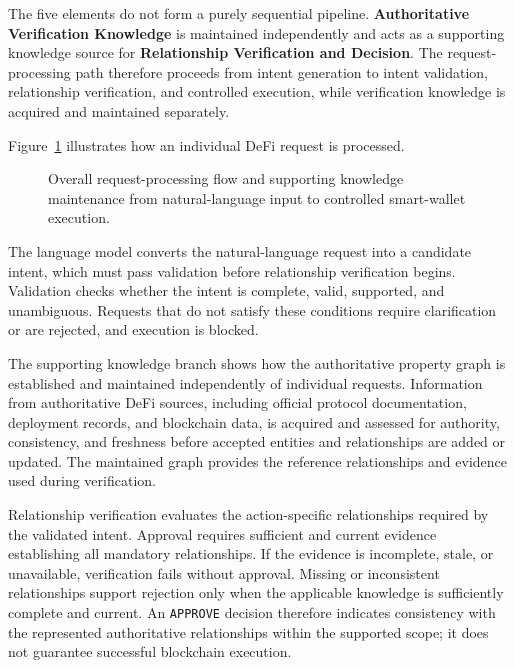 The five elements do not form a purely sequential pipeline.
\textbf{Authoritative Verification Knowledge} is maintained independently and
acts as a supporting knowledge source for
\textbf{Relationship Verification and Decision}. The request-processing path
therefore proceeds from intent generation to intent validation, relationship
verification, and controlled execution, while verification knowledge is
acquired and maintained separately.

Figure~\ref{fig:overall_system_flow} illustrates how an individual DeFi
request is processed. 

\begin{figure}[H]
    \centering
    \resizebox{0.90\textwidth}{!}{%
    }
    \caption{Overall request-processing flow and supporting knowledge
    maintenance from natural-language input to controlled smart-wallet
    execution.}
    \label{fig:overall_system_flow}
\end{figure}
The language model converts the natural-language
request into a candidate intent, which must pass validation before
relationship verification begins. Validation checks whether the intent is
complete, valid, supported, and unambiguous. Requests that do not satisfy
these conditions require clarification or are rejected, and execution is
blocked.


The supporting knowledge branch shows how the authoritative property graph
is established and maintained independently of individual requests.
Information from authoritative DeFi sources, including official protocol
documentation, deployment records, and blockchain data, is acquired and
assessed for authority, consistency, and freshness before accepted entities
and relationships are added or updated. The maintained graph provides the
reference relationships and evidence used during verification.

Relationship verification evaluates the action-specific relationships
required by the validated intent. Approval requires sufficient and current
evidence establishing all mandatory relationships. If the evidence is
incomplete, stale, or unavailable, verification fails without approval.
Missing or inconsistent relationships support rejection only when the
applicable knowledge is sufficiently complete and current. An
\texttt{APPROVE} decision therefore indicates consistency with the
represented authoritative relationships within the supported scope; it does
not guarantee successful blockchain execution.

